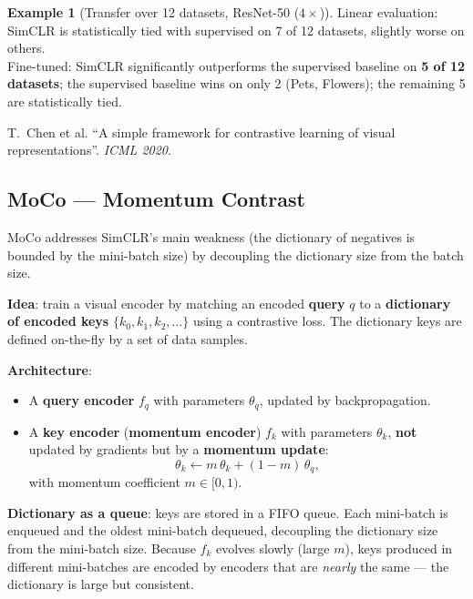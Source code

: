 \documentclass[11pt,a4paper]{article}
\theoremstyle{definition}
\newtheorem{example}{Example}[section]
\theoremstyle{plain}
\theoremstyle{remark}
\begin{document}
\begin{example}[Transfer over 12 datasets, ResNet-50 ($4\times$)]
Linear evaluation: SimCLR is statistically tied with supervised on 7 of 12 datasets, slightly worse on others.\\
Fine-tuned: SimCLR significantly outperforms the supervised baseline on \textbf{5 of 12 datasets}; the supervised baseline wins on only 2 (Pets, Flowers); the remaining 5 are statistically tied.
\end{example}

\begin{tcolorbox}[colback=blue!5!white,colframe=blue!60!black,title={Reference}]
T.\ Chen et al. ``A simple framework for contrastive learning of visual representations''. \textit{ICML 2020}.
\end{tcolorbox}

\subsection{MoCo --- Momentum Contrast}

MoCo addresses SimCLR's main weakness (the dictionary of negatives is bounded by the mini-batch size) by decoupling the dictionary size from the batch size.

\textbf{Idea}: train a visual encoder by matching an encoded \textbf{query} $q$ to a \textbf{dictionary of encoded keys} $\{k_0, k_1, k_2, \ldots\}$ using a contrastive loss. The dictionary keys are defined on-the-fly by a set of data samples.

\textbf{Architecture}:
\begin{itemize}
    \item A \textbf{query encoder} $f_q$ with parameters $\theta_q$, updated by backpropagation.
    \item A \textbf{key encoder} (\textbf{momentum encoder}) $f_k$ with parameters $\theta_k$, \textbf{not} updated by gradients but by a \textbf{momentum update}:
    \begin{equation}
        \theta_k \leftarrow m\,\theta_k + (1-m)\,\theta_q,
    \end{equation}
    with momentum coefficient $m \in [0,1)$.
\end{itemize}

\textbf{Dictionary as a queue}: keys are stored in a FIFO queue. Each mini-batch is enqueued and the oldest mini-batch dequeued, decoupling the dictionary size from the mini-batch size. Because $f_k$ evolves slowly (large $m$), keys produced in different mini-batches are encoded by encoders that are \emph{nearly} the same --- the dictionary is large but consistent.
\end{document}
